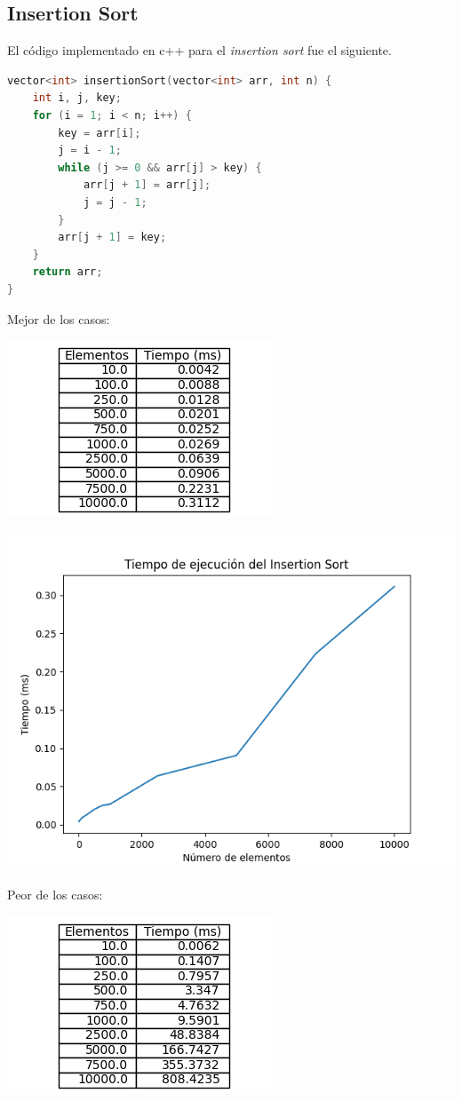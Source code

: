 \documentclass[14pt,a4paper]{report}
\begin{document}
\subsection*{Insertion Sort}
\quad El código implementado en c++ para el \textit{insertion sort} fue el siguiente.
\begin{lstlisting}[language=C++]
vector<int> insertionSort(vector<int> arr, int n) {
    int i, j, key;
    for (i = 1; i < n; i++) {
        key = arr[i];
        j = i - 1;
        while (j >= 0 && arr[j] > key) {
            arr[j + 1] = arr[j];
            j = j - 1;
        }
        arr[j + 1] = key;
    }
    return arr;
}
\end{lstlisting}
Mejor de los casos:
\begin{center}
\includegraphics[scale=1]{../tabla-insertion-best.png}  
\end{center}
\begin{center}
\includegraphics[scale=0.9]{../grafica-insertion-best.png} 
\end{center}
\newpage
Peor de los casos:
\begin{center}
\includegraphics[scale=1]{../tabla-insertion-worst.png}  
\end{center}
\end{document}
